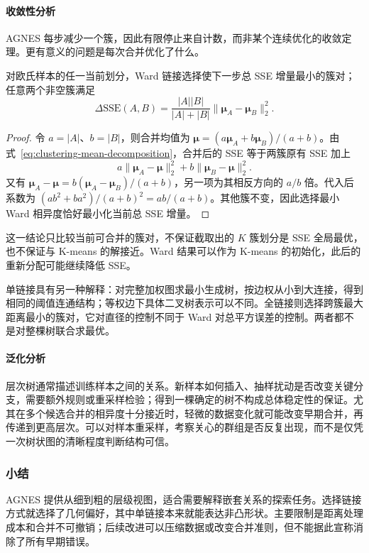 \paragraph{收敛性分析}
AGNES 每步减少一个簇，因此有限停止来自计数，而非某个连续优化的收敛定理。更有意义的问题是每次合并优化了什么。

\begin{theorem}
 \label{thm:clustering-ward}
 对欧氏样本的任一当前划分，Ward 链接选择使下一步总 SSE 增量最小的簇对；任意两个非空簇满足
 \[
 \Delta\mathrm{SSE}(A,B)
 =\frac{|A||B|}{|A|+|B|}
   \lVert\bm{\mu}_A-\bm{\mu}_B\rVert_2^2.
 \]
\end{theorem}
\begin{proof}
令 $a=|A|$、$b=|B|$，则合并均值为 $\bm{\mu}=(a\bm{\mu}_A+b\bm{\mu}_B)/(a+b)$。由式~\eqref{eq:clustering-mean-decomposition}，合并后的 SSE 等于两簇原有 SSE 加上
\[
 a\lVert\bm{\mu}_A-\bm{\mu}\rVert_2^2+
 b\lVert\bm{\mu}_B-\bm{\mu}\rVert_2^2.
\]
又有 $\bm{\mu}_A-\bm{\mu}=b(\bm{\mu}_A-\bm{\mu}_B)/(a+b)$，另一项为其相反方向的 $a/b$ 倍。代入后系数为 $(ab^2+ba^2)/(a+b)^2=ab/(a+b)$。其他簇不变，因此选择最小 Ward 相异度恰好最小化当前总 SSE 增量。
\end{proof}

这一结论只比较当前可合并的簇对，不保证截取出的 $K$ 簇划分是 SSE 全局最优，也不保证与 K-means 的解接近。Ward 结果可以作为 K-means 的初始化，此后的重新分配可能继续降低 SSE。

单链接具有另一种解释：对完整加权图求最小生成树，按边权从小到大连接，得到相同的阈值连通结构；等权边下具体二叉树表示可以不同。全链接则选择跨簇最大距离最小的簇对，它对直径的控制不同于 Ward 对总平方误差的控制。两者都不是对整棵树联合求最优。

\paragraph{泛化分析}
层次树通常描述训练样本之间的关系。新样本如何插入、抽样扰动是否改变关键分支，需要额外规则或重采样检验；得到一棵确定的树不构成总体稳定性的保证。尤其在多个候选合并的相异度十分接近时，轻微的数据变化就可能改变早期合并，再传递到更高层次。可以对样本重采样，考察关心的群组是否反复出现，而不是仅凭一次树状图的清晰程度判断结构可信。

\subsubsection{小结}

AGNES 提供从细到粗的层级视图，适合需要解释嵌套关系的探索任务。选择链接方式就选择了几何偏好，其中单链接本来就能表达非凸形状。主要限制是距离处理成本和合并不可撤销；后续改进可以压缩数据或改变合并准则，但不能据此宣称消除了所有早期错误。

